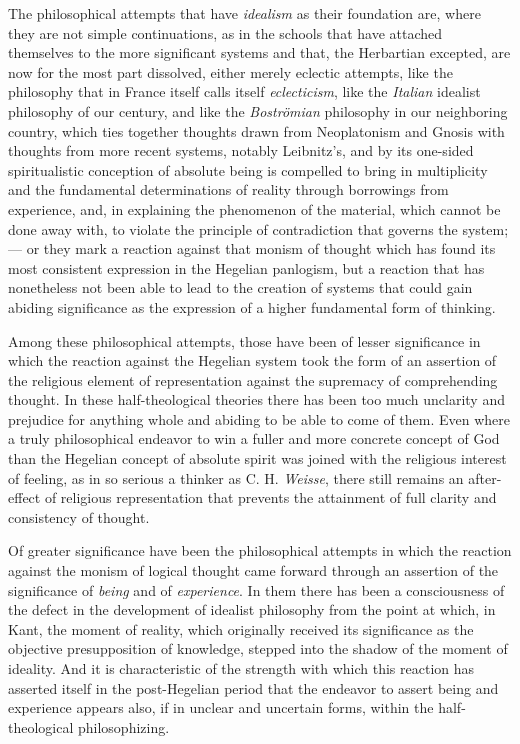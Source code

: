 The philosophical attempts that have \emph{idealism} as their
foundation are, where they are not simple continuations, as in the
schools that have attached themselves to the more significant systems
and that, the Herbartian excepted, are now for the most part dissolved,
either merely eclectic attempts, like the philosophy that in France
itself calls itself \emph{eclecticism}, like the \emph{Italian}
idealist philosophy of our century, and like the \emph{Boströmian}
philosophy in our neighboring country, which ties together thoughts
drawn from Neoplatonism and Gnosis with thoughts from more recent
systems, notably Leibnitz's, and by its one-sided spiritualistic
conception of absolute being is compelled to bring in multiplicity and
the fundamental determinations of reality through borrowings from
experience, and, in explaining the phenomenon of the material, which
cannot be done away with, to violate the principle of contradiction
that governs the system; --- or they mark a reaction against that
monism of thought which has found its most consistent expression in the
Hegelian panlogism, but a reaction that has nonetheless not been able
to lead to the creation of systems that could gain abiding significance
as the expression of a higher fundamental form of thinking.

Among these philosophical attempts, those have been of lesser
significance in which the reaction against the Hegelian system took
the form of an assertion of the religious element of representation
against the supremacy of comprehending thought. In these
half-theological theories there has been too much unclarity and
prejudice for anything whole and abiding to be able to come of them.
Even where a truly philosophical endeavor to win a fuller and
more concrete concept of God than the Hegelian concept of absolute
spirit was joined with the religious interest of feeling, as in so
serious a thinker as C. H. \emph{Weisse}, there still remains an
after-effect of religious representation that prevents the attainment
of full clarity and consistency of thought.

Of greater significance have been the philosophical attempts in which
the reaction against the monism of logical thought came forward through
an assertion of the significance of \emph{being} and of
\emph{experience}. In them there has been a consciousness of the defect
in the development of idealist philosophy from the point at which, in
Kant, the moment of reality, which originally received its significance
as the objective presupposition of knowledge, stepped into the shadow of
the moment of ideality. And it is characteristic of the strength with
which this reaction has asserted itself in the post-Hegelian period
that the endeavor to assert being and experience appears also, if in
unclear and uncertain forms, within the half-theological philosophizing.

